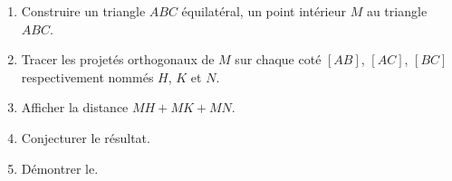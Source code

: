 

\begin{enumerate}
\item Construire un triangle $ABC$ équilatéral, un point intérieur $M$ au triangle $ABC$. 
\item Tracer les projetés orthogonaux de $M$ sur chaque coté $[AB]$, $[AC]$, $[BC]$ respectivement nommés $H$, $K$ et $N$.
\item Afficher la distance $MH+MK+MN$. 
\item Conjecturer le résultat. 
\item Démontrer le. 
\end{enumerate}